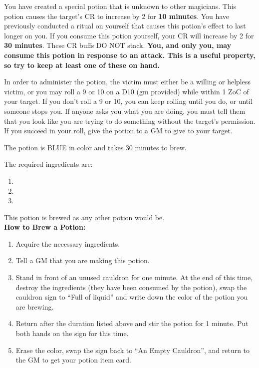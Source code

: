 \documentclass[green]{NeptuneBall}
\begin{document}
\name{\gBuff{}}

You have created a special potion that is unknown to other magicians. This potion causes the target's CR to increase by 2 for {\bf 10 minutes}.  You have previously conducted a ritual on yourself that causes this potion's effect to last longer on you. If you consume this potion yourself, your CR will increase by 2 for {\bf 30 minutes}. These CR buffs DO NOT stack. {\bf You, and only you, may consume this potion in response to an attack. This is a useful property, so try to keep at least one of these on hand.}

In order to administer the potion, the victim must either be a willing or helpless victim, or you may roll a 9 or 10 on a D10 (gm provided) while within 1 ZoC of your target. If you don't roll a 9 or 10, you can keep rolling until you do, or until someone stops you. If anyone asks you what you are doing, you must tell them that you look like you are trying to do something without the target's permission. If you succeed in your roll, give the potion to a GM to give to your target.

The potion is BLUE in color and takes 30 minutes to brew. 

The required ingredients are:
\begin{enumerate}
\item \iManOfWar{}
\item \iTeeth{}
\item \iSwordfish{}
\end{enumerate}

This potion is brewed as any other potion would be.\\

{\bf How to Brew a Potion:}\\ %
\begin{enumerate}
  \item Acquire the necessary ingredients.
	\item Tell a GM that you are making this potion.
  \item Stand in front of an unused cauldron for one minute. At the end of this time, destroy the ingredients (they have been consumed by the potion), swap the cauldron sign to ``Full of liquid'' and write down the color of the potion you are brewing.
  \item Return after the duration listed above and stir the potion for 1 minute. Put both hands on the sign for this time.
  \item Erase the color, swap the sign back to ``An Empty Cauldron'', and return to the GM to get your potion item card.
\end{enumerate}
\end{document}
